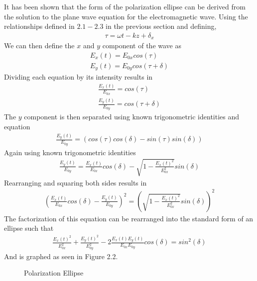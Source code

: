 It has been shown that the form of the polarization ellipse can be derived from the solution to the plane wave equation for the electromagnetic wave.  Using the relationships defined in $2.1-2.3$ in the previous section and defining,
%
\begin{align}
    \tau=\omega t-kz+\delta_x
\end{align}
%
We can then define the $x$ and $y$ component of the wave as
%
\begin{align}
	E_x (t)=E_{0x} cos(\tau)\\
	E_y (t)=E_{0y} cos(\tau+\delta )
\end{align}
%
Dividing each equation by its intensity results in
%
\begin{align}
    \frac{E_x (t)}{E_{0x}} =cos(\tau) \\
    \frac{E_y (t)}{E_{0y}} =cos(\tau+\delta )
\end{align}
%
The $y$ component is then separated using known trigonometric identities and equation
%
\begin{align}
\frac{E_y (t)}{E_{0y}} =  (cos(\tau) cos(\delta)-sin(\tau)sin(\delta))
\end{align}
%
Again using known trigonometric identities
%
\begin{align}
    \frac{E_y (t)}{E_{0y}} = \frac{E_x (t)}{E_{0x}}   cos(\delta)-\sqrt{1-\frac{E_x (t)^2}{E_{0x}^2} } sin(\delta)
\end{align}
%
Rearranging and squaring both sides results in
%
\begin{align}
    (\frac{E_x (t)}{E_{0x}}   cos(\delta)-\frac{E_y (t)}{E_{0y}} )^2=(\sqrt{1-\frac{E_x (t)^2}{E_{0x}^2} } sin(\delta))^2
\end{align}
%
The factorization of this equation can be rearranged into the standard form of an ellipse such that
%
\begin{align}
    \frac{E_x (t)^2}{E_{0x}^2} +\frac{E_y (t)^2}{E_{0y}^2} -2 \frac{E_x (t) E_y (t)}{E_{0x} E_{0y} } cos(\delta)=sin^2 (\delta)
\end{align}
%
And is graphed as seen in Figure 2.2.
%
\begin{figure}
    \begin{center}
    \end{center}
    \caption{Polarization Ellipse}
    \label{fig:polarization}
\end{figure}
%

